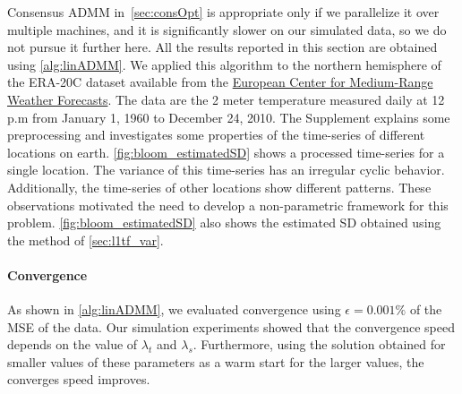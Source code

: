 \documentclass{article}
\begin{document}
Consensus ADMM in~\autoref{sec:consOpt} is appropriate only if
we parallelize it over multiple machines, and it is significantly
slower on our simulated data, so we do not pursue it
further here. All the results reported in this section are obtained
using \autoref{alg:linADMM}. We
applied this algorithm to the northern hemisphere of the ERA-20C
dataset available from the \href {https://www.ecmwf.int}{European Center for Medium-Range
  Weather Forecasts}. The data are
the 2 meter temperature measured daily at 12 p.m from January 1, 1960
to December 24, 2010. The Supplement explains some preprocessing and investigates some
properties of the time-series of different locations on
earth. \autoref{fig:bloom_estimatedSD} shows a processed time-series for a
single location.
The variance of this time-series has an irregular cyclic
behavior. Additionally, the time-series of other locations show 
different patterns. These observations motivated the need to develop a
non-parametric framework for this
problem. \autoref{fig:bloom_estimatedSD} also shows the
estimated SD obtained using the method of
\autoref{sec:l1tf_var}. 

\paragraph{Convergence}

As shown in \autoref{alg:linADMM}, we evaluated convergence using
$\epsilon=0.001\%$ of the MSE of the data.
Our simulation experiments showed that the
convergence speed depends on the value of $\lambda_t$ and
$\lambda_s$. Furthermore, using the solution obtained for smaller values
of these parameters as a warm start for the larger values, the
converges speed improves.   
\end{document}
